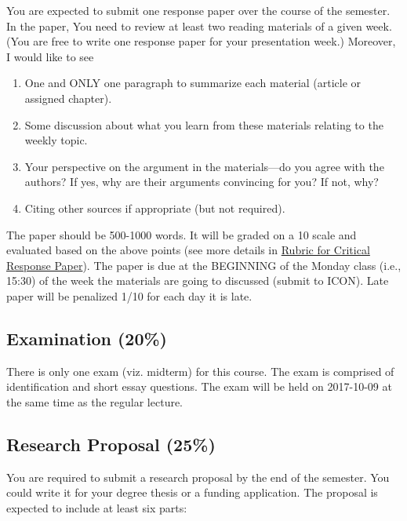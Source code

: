 \documentclass[11pt,]{article}
\providecommand{\tightlist}{%
  \setlength{\itemsep}{0pt}\setlength{\parskip}{0pt}}
\theoremstyle{definition}
\theoremstyle{definition}
\theoremstyle{remark}
\begin{document}
You are expected to submit one response paper over the course of the
semester. In the paper, You need to review at least two reading
materials of a given week. (You are free to write one response paper for
your presentation week.) Moreover, I would like to see

\begin{enumerate}
\def\labelenumi{\arabic{enumi}.}
\tightlist
\item
  One and ONLY one paragraph to summarize each material (article or
  assigned chapter).
\item
  Some discussion about what you learn from these materials relating to
  the weekly topic.
\item
  Your perspective on the argument in the materials---do you agree with
  the authors? If yes, why are their arguments convincing for you? If
  not, why?
\item
  Citing other sources if appropriate (but not required).
\end{enumerate}

The paper should be 500-1000 words. It will be graded on a 10 scale and
evaluated based on the above points (see more details in
\protect\hyperlink{id}{Rubric for Critical Response Paper}). The paper
is due at the BEGINNING of the Monday class (i.e., 15:30) of the week
the materials are going to discussed (submit to ICON). Late paper will
be penalized 1/10 for each day it is late.

\subsection{Examination (20\%)}\label{examination-20}

There is only one exam (viz. midterm) for this course. The exam is
comprised of identification and short essay questions. The exam will be
held on 2017-10-09 at the same time as the regular lecture.

\subsection{Research Proposal (25\%)}\label{research-proposal-25}

You are required to submit a research proposal by the end of the
semester. You could write it for your degree thesis or a funding
application. The proposal is expected to include at least six parts:
\end{document}
